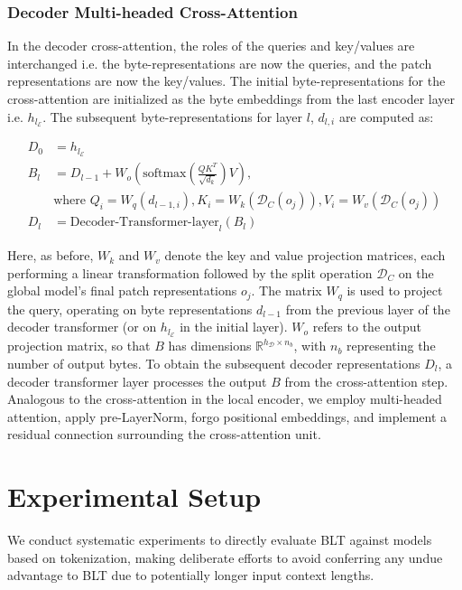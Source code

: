 \subsubsection{Decoder Multi-headed Cross-Attention} 

In the decoder cross-attention, the roles of the queries and key/values are interchanged i.e. the byte-representations are now the queries, and the patch representations are now the key/values. The initial byte-representations for the cross-attention are initialized as the byte embeddings from the last encoder layer i.e. $h_{l_{\mathcal{E}}}$. The subsequent byte-representations for layer $l$, $d_{l,i}$ are computed as:

\begin{align}
D_0 &= h_{l_{\mathcal{E}}} \\
B_l &= D_{l-1} + W_o\left(\text{softmax}\left(\frac{QK^T}{\sqrt{d_k}}\right)V\right), \\
  &\text{where } Q_i = W_q(d_{l-1,i}), K_i = W_k(\mathcal{D}_C(o_j)), V_i = W_v(\mathcal{D}_C(o_j)) \\
  D_l &= \text{Decoder-Transformer-layer}_l(B_l)
\end{align}

Here, as before, $W_k$ and $W_v$ denote the key and value projection matrices, each performing a linear transformation followed by the split operation $\mathcal{D}_C$ on the global model’s final patch representations $o_j$. The matrix $W_q$ is used to project the query, operating on byte representations $d_{l-1}$ from the previous layer of the decoder transformer (or on $h_{l_{\mathcal{E}}}$ in the initial layer). $W_o$ refers to the output projection matrix, so that $B$ has dimensions $\mathbb{R}^{h_{\mathcal{D}} \times n_b}$, with $n_b$ representing the number of output bytes. To obtain the subsequent decoder representations $D_l$, a decoder transformer layer processes the output $B$ from the cross-attention step. Analogous to the cross-attention in the local encoder, we employ multi-headed attention, apply pre-LayerNorm, forgo positional embeddings, and implement a residual connection surrounding the cross-attention unit.

\section{Experimental Setup}
\label{section:experiments}
We conduct systematic experiments to directly evaluate {\textsc BLT} against models based on tokenization, making deliberate efforts to avoid conferring any undue advantage to {\textsc BLT} due to potentially longer input context lengths.

